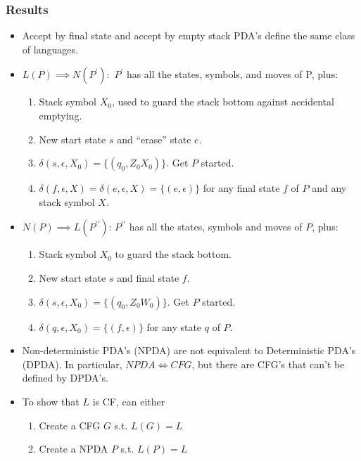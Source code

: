 \subsubsection{Results}
\begin{itemize}
    \item Accept by final state and accept by empty stack PDA's define the same class of languages.
    \item $L(P) \implies N(P^\prime): $ $P^\prime$ has all the states, symbols, and moves of P, plus:
    \begin{enumerate}
        \item Stack symbol $X_0$, used to guard the stack bottom against accidental emptying.
        \item New start state $s$ and “erase” state $e.$
        \item $\delta(s, \epsilon, X_0) = \{ (q_0, Z_0X_0) \} $. Get $P$ started. 
        \item $\delta(f, \epsilon, X) = \delta(e, \epsilon, X) = \{(e, \epsilon)\}$ for any final state $f$ of $P$ and any stack symbol $X$. 
    \end{enumerate}
    \item $N(P)\implies L(P^{\prime\prime})$: $P^{\prime \prime}$ has all the states, symbols and moves of $P$, plus: 
    \begin{enumerate}
        \item Stack symbol $X_0$ to guard the stack bottom. 
        \item New start state $s$ and final state $f$. 
        \item $\delta(s, \epsilon, X_0) = \{ (q_0 , Z_0 W_0) \} $. Get $P$ started. 
        \item $\delta(q, \epsilon, X_0 )= \{(f, \epsilon)\}$ for any state $q$ of $P.$
    \end{enumerate}
    \item Non-deterministic PDA's (NPDA) are not equivalent to Deterministic PDA's (DPDA). In particular, $NPDA\iff CFG$, but there are CFG's that can't be defined by DPDA's.
    \item To show that $L$ is CF, can either 
    \begin{enumerate}
        \item Create a CFG $G$ s.t. $L(G) = L$
        \item Create a NPDA $P$ s.t. $L(P) = L$
    \end{enumerate}
    
    \end{itemize}
